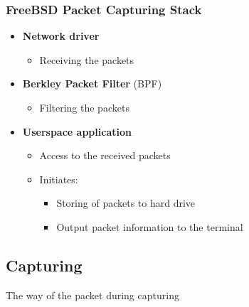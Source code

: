 \documentclass{beamer}
\begin{document}
\begin{frame}
\frametitle{FreeBSD Packet Capturing Stack}
\begin{itemize}
	\item \textbf{Network driver}
		\begin{itemize}
			\item Receiving the packets\newline
		\end{itemize}
	\item \textbf{Berkley Packet Filter} (BPF)
		\begin{itemize}
			\item Filtering the packets\newline
		\end{itemize}
	\item \textbf{Userspace application}
		\begin{itemize}
			\item Access to the received packets
			\item Initiates:
				\begin{itemize}
					\item Storing of packets to hard drive
					\item Output packet information to the terminal
				\end{itemize}
		\end{itemize}
\end{itemize}
\end{frame}

\subsection*{Capturing}
\begin{frame}
	\begin{center}
	\huge{The way of the packet during capturing}
	\end{center}
\end{frame}
\end{document}
